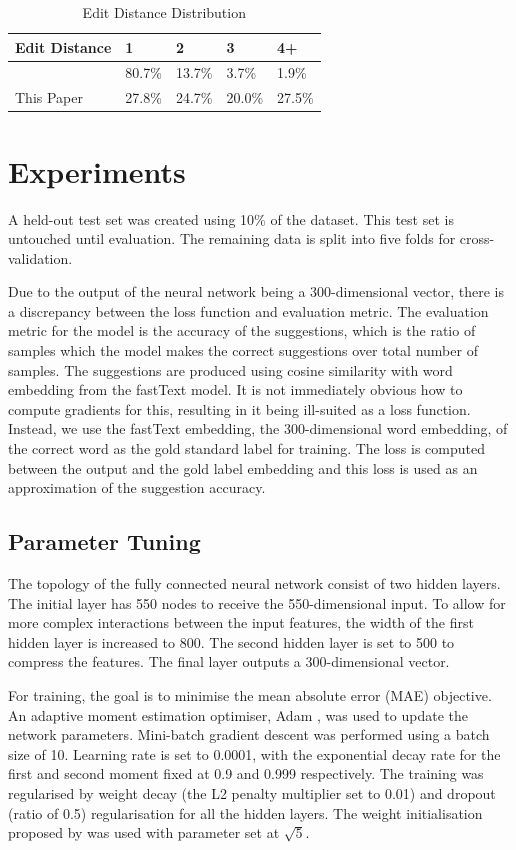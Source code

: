 \documentclass[11pt,a4paper]{article}
\begin{document}
\begin{table}[]
\caption{Edit Distance Distribution}
\begin{tabular}{l|llll}
Edit Distance & 1      & 2      & 3      & 4+     \\ \hline
{\ul }\citet{fourcontext} & 80.7\% & 13.7\% & 3.7\%  & 1.9\%  \\
This Paper & 27.8\% & 24.7\% & 20.0\% & 27.5\%
\end{tabular}
\label{Tab:EditDist}
\end{table}

\section{Experiments}\label{experiments}
A held-out test set was created using 10\% of the dataset. This test set is untouched until evaluation. The remaining data is split into five folds for cross-validation. 

Due to the output of the neural network being a 300-dimensional vector, there is a discrepancy between the loss function and evaluation metric. The evaluation metric for the model is the accuracy of the suggestions, which is the ratio of samples which the model makes the correct suggestions over total number of samples. The suggestions are produced using cosine similarity with word embedding from the fastText model. It is not immediately obvious how to compute gradients for this, resulting in it being ill-suited as a loss function. Instead, we use the fastText embedding, the 300-dimensional word embedding, of the correct word as the gold standard label for training. The loss is computed between the output and the gold label embedding and this loss is used as an approximation of the suggestion accuracy.

\subsection{Parameter Tuning}\label{paramsel}
The topology of the fully connected neural network consist of two hidden layers. The initial layer has 550 nodes to receive the 550-dimensional input. To allow for more complex interactions between the input features, the width of the first hidden layer is increased to 800. The second hidden layer is set to 500 to compress the features. The final layer outputs a 300-dimensional vector.

For training, the goal is to minimise the mean absolute error (MAE) objective. An adaptive moment estimation optimiser, Adam \cite{adam}, was used to update the network parameters. Mini-batch gradient descent was performed using a batch size of 10. Learning rate is set to 0.0001, with the exponential decay rate for the first and second moment fixed at 0.9 and 0.999 respectively. The training was regularised by weight decay (the L2 penalty multiplier set to 0.01) and dropout (ratio of 0.5) regularisation for all the hidden layers. The weight initialisation proposed by \citet{weights} was used with parameter set at $\sqrt{5}$.
\end{document}
